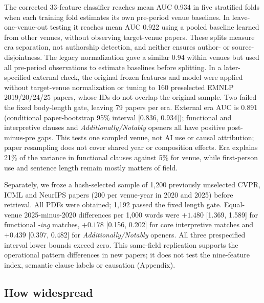 \documentclass[10pt,twocolumn]{article}
\begin{document}
The corrected 33-feature classifier reaches mean AUC 0.934 in five stratified folds when each training fold estimates its own pre-period venue baselines. In leave-one-venue-out testing it reaches mean AUC 0.922 using a pooled baseline learned from other venues, without observing target-venue papers. These splits measure era separation, not authorship detection, and neither ensures author- or source-disjointness. The legacy normalization gave a similar 0.94 within venues but used all pre-period observations to estimate baselines before splitting. In a later-specified external check, the original frozen features and model were applied without target-venue normalization or tuning to 160 preselected EMNLP 2019/20/24/25 papers, whose IDs do not overlap the original sample. Two failed the fixed body-length gate, leaving 79 papers per era. External era AUC is 0.891 (conditional paper-bootstrap 95\% interval [0.836, 0.934]); functional and interpretive clauses and \textit{Additionally/Notably} openers all have positive post-minus-pre gaps. This tests one sampled venue, not AI use or causal attribution; paper resampling does not cover shared year or composition effects. Era explains 21\% of the variance in functional clauses against 5\% for venue, while first-person use and sentence length remain mostly matters of field.

Separately, we froze a hash-selected sample of 1,200 previously unselected CVPR, ICML and NeurIPS papers (200 per venue-year in 2020 and 2025) before retrieval. All PDFs were obtained; 1,192 passed the fixed length gate. Equal-venue 2025-minus-2020 differences per 1,000 words were $+1.480$ [1.369, 1.589] for functional \textit{-ing} matches, $+0.178$ [0.156, 0.202] for core interpretive matches and $+0.439$ [0.397, 0.482] for \textit{Additionally/Notably} openers. All three prespecified interval lower bounds exceed zero. This same-field replication supports the operational pattern differences in new papers; it does not test the nine-feature index, semantic clause labels or causation (Appendix).

\begin{table}[t]
\centering\footnotesize
\resizebox{\columnwidth}{!}{}
\caption{Original v3 robustness and placebo checks. Classifier rows used legacy full-data normalization; corrected fold-local and unseen-venue AUCs are reported in the text. SD: the venue's pre-LLM standard deviation.}
\label{tab:robust}
\end{table}

\subsection{How widespread}
\end{document}
